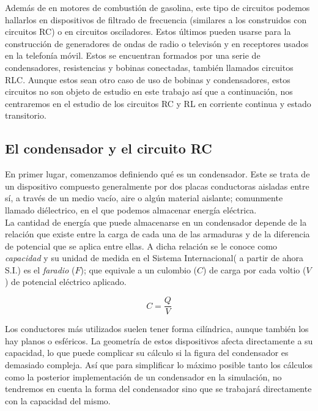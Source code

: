 \documentclass[../main.tex]{subfiles}
\begin{document}
Además de en motores de combustión de gasolina, este tipo de circuitos podemos hallarlos en dispositivos de filtrado de frecuencia (similares a los construidos con circuitos RC) o en circuitos osciladores. Estos últimos pueden usarse para la construcción de generadores de ondas de radio o televisón y en receptores usados en la telefonía móvil. Estos se encuentran formados por una serie de condensadores, resistencias y bobinas conectadas, también llamados circuitos RLC. Aunque estos sean otro caso de uso de bobinas y condensadores, estos circuitos no son objeto de estudio en este trabajo así que a continuación, nos centraremos en el estudio de los circuitos RC y RL en corriente continua y estado transitorio.


\subsection{El condensador y el circuito RC}
En primer lugar, comenzamos definiendo qué es un condensador. Este se trata de un dispositivo compuesto generalmente por dos placas conductoras aisladas entre sí, a través de un medio vacío, aire o algún material aislante; comunmente llamado diélectrico, en el que podemos almacenar energía eléctrica.\\ 

La cantidad de energía que puede almacenarse en un condensador depende de la relación que existe entre la carga de cada una de las armaduras y de la diferencia de potencial que se aplica entre ellas. A dicha relación se le conoce como \textit{capacidad} y su unidad de medida en el Sistema Internacional( a partir de ahora S.I.) es el \textit{faradio} ($F$); que equivale a un culombio ($C$) de carga por cada voltio ($V$) de potencial eléctrico aplicado.

\begin{equation}
    \label{def::capacidad_conductor}
    C = \frac{Q}{V}
\end{equation}

Los conductores más utilizados suelen tener forma cilíndrica, aunque también los hay planos o esféricos. La geometría de estos dispositivos afecta directamente a su capacidad, lo que puede complicar su cálculo si la figura del condensador es demasiado compleja. Así que para simplificar lo máximo posible tanto los cálculos como la posterior implementación de un condensador en la simulación, no tendremos en cuenta la forma del condensador sino que se trabajará directamente con la capacidad del mismo.\\ 
\end{document}
